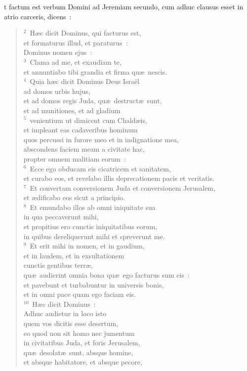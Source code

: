 \bchapter
{}t factum est verbum Domini ad Jeremiam secundo, cum adhuc clausus esset in atrio carceris, dicens~:
\begin{verse}${}^{2}$~H\ae c dicit Dominus, qui facturus est,\\ et formaturus illud, et paraturus~:\\ Dominus nomen ejus~:\\
${}^{3}$~Clama ad me, et exaudiam te,\\ et annuntiabo tibi grandia et firma qu\ae\ nescis.\\
${}^{4}$~Quia h\ae c dicit Dominus Deus Isra\"el\\ ad domos urbis hujus,\\ et ad domos regis Juda, qu\ae\ destruct\ae\ sunt,\\ et ad munitiones, et ad gladium\\
${}^{5}$~venientium ut dimicent cum Chald\ae is,\\ et impleant eas cadaveribus hominum\\ quos percussi in furore meo et in indignatione mea,\\ abscondens faciem meam a civitate hac,\\ propter omnem malitiam eorum~:\\
${}^{6}$~Ecce ego obducam eis cicatricem et sanitatem,\\ et curabo eos, et revelabo illis deprecationem pacis et veritatis.\\
${}^{7}$~Et convertam conversionem Juda et conversionem Jerusalem,\\ et \ae dificabo eos sicut a principio.\\
${}^{8}$~Et emundabo illos ab omni iniquitate sua\\ in qua peccaverunt mihi,\\ et propitius ero cunctis iniquitatibus eorum,\\ in quibus dereliquerunt mihi et spreverunt me.\\
${}^{9}$~Et erit mihi in nomen, et in gaudium,\\ et in laudem, et in exsultationem\\ cunctis gentibus terr\ae ,\\ qu\ae\ audierint omnia bona qu\ae\ ego facturus sum eis~:\\ et pavebunt et turbabuntur in universis bonis,\\ et in omni pace quam ego faciam eis.\\
${}^{10}$~H\ae c dicit Dominus~:\\ Adhuc audietur in loco isto\\ quem vos dicitis esse desertum,\\ eo quod non sit homo nec jumentum\\ in civitatibus Juda, et foris Jerusalem,\\ qu\ae\ desolat\ae\ sunt, absque homine,\\ et absque habitatore, et absque pecore,\\

\end{verse}
